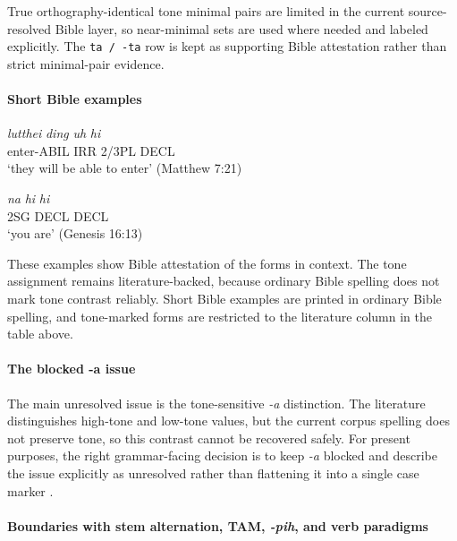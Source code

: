 \documentclass[
  11pt,
  a4paper,
]{article}
\newcommand{\tdim}[1]{\textit{#1}}
\newcommand{\tdimword}[1]{\textit{#1}}
\renewcommand{\textsc}[1]{{\footnotesize\MakeUppercase{#1}}}
\newcommand{\glossquote}[1]{`#1'}
\begin{document}
True orthography-identical tone minimal pairs are limited in the current
source-resolved Bible layer, so near-minimal sets are used where needed
and labeled explicitly. The \texttt{ta\ /\ -ta} row is kept as
supporting Bible attestation rather than strict minimal-pair evidence.

\paragraph{Short Bible examples}\label{short-bible-examples}

\begin{exe}
\ex \label{ex:phon-thei-abil-matt7}
\gll \tdimword{lutthei} \tdimword{ding} \tdimword{uh} \tdimword{hi} \\
     enter-\textsc{abil} \textsc{irr} 2/3PL \textsc{decl} \\
\glt \glossquote{they will be able to enter} (Matthew 7:21)
\end{exe}

\begin{exe}
\ex \label{ex:phon-hi-lex-gram-gen16}
\gll \tdimword{na} \tdimword{hi} \tdimword{hi} \\
     \textsc{2sg} \textsc{decl} \textsc{decl} \\
\glt \glossquote{you are} (Genesis 16:13)
\end{exe}

These examples show Bible attestation of the forms in context. The tone
assignment remains literature-backed, because ordinary Bible spelling
does not mark tone contrast reliably. Short Bible examples are printed
in ordinary Bible spelling, and tone-marked forms are restricted to the
literature column in the table above.

\paragraph{The blocked -a issue}\label{the-blocked--a-issue}

The main unresolved issue is the tone-sensitive \tdim{-a} distinction.
The literature distinguishes high-tone and low-tone values, but the
current corpus spelling does not preserve tone, so this contrast cannot
be recovered safely. For present purposes, the right grammar-facing
decision is to keep \tdim{-a} blocked and describe the issue explicitly
as unresolved rather than flattening it into a single case marker
\citep[pp.~57-60]{zamngaihcing2017}.

\paragraph{\texorpdfstring{Boundaries with stem alternation, TAM,
\tdim{-pih}, and verb
paradigms}{Boundaries with stem alternation, TAM, , and verb paradigms}}\label{boundaries-with-stem-alternation-tam-and-verb-paradigms}
\end{document}
